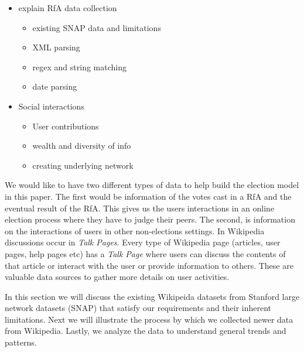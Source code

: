 \begin{itemize}
    \item explain RfA data collection 
    \begin{itemize}
        \item existing SNAP data and limitations
        \item XML parsing 
        \item regex and string matching 
        \item date parsing
    \end{itemize}
    \item Social interactions 
    \begin{itemize}
        \item User contributions
        \item wealth and diversity of info 
        \item creating underlying network
    \end{itemize}   
\end{itemize}

We would like to have two different types of data to help build the election model in this paper. The first would be information of the votes cast in a RfA and the eventual result of the RfA. This gives us the users interactions in an online election process where they have to judge their peers. The second, is information on the interactions of users in other non-elections settings. In Wikipedia discussions occur in \textit{Talk Pages}. Every type of Wikipedia page (articles, user pages, help pages etc) has a \textit{Talk Page} where users can discuss the contents of that article or interact with the user or provide information to others. These are valuable data sources to gather more details on user activities.
\smallskip

In this section we will discuss the existing Wikipeida datasets from Stanford large network datasets (SNAP) \cite{snapnets} that satisfy our requirements and their inherent limitations. Next we will illustrate the process by which we collected newer data from Wikipedia. Lastly, we analyze the data to understand general trends and patterns.

\newcommand{\wikirfa}{\textit{wiki-Rfa} }
\newcommand{\wikielect}{\textit{wiki-Elect} }

